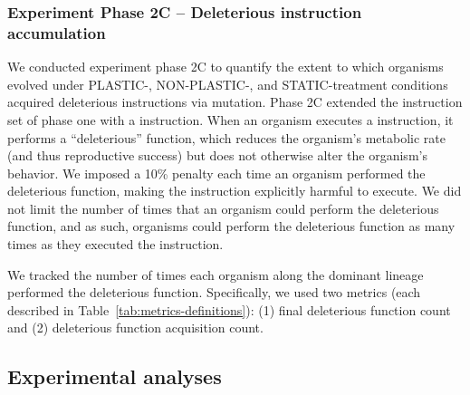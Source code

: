\begin{raggedbottom}
\subsubsection{Experiment Phase 2C -- Deleterious instruction accumulation}
\label{sec:methods:exp:deleterious-instruction-accumulation}

We conducted experiment phase 2C to quantify the extent to which organisms evolved under PLASTIC-, NON-PLASTIC-, and STATIC-treatment conditions acquired deleterious instructions via mutation.
Phase 2C extended the instruction set of phase one with a  instruction.
When an organism executes a  instruction, it performs a ``deleterious'' function, which reduces the organism's metabolic rate (and thus reproductive success) but does not otherwise alter the organism's behavior.
We imposed a 10\% penalty each time an organism performed the deleterious function, making the  instruction explicitly harmful to execute.
We did not limit the number of times that an organism could perform the deleterious function, and as such, organisms could perform the deleterious function as many times as they executed the  instruction.

We tracked the number of times each organism along the dominant lineage performed the deleterious function.
Specifically, we used two metrics (each described in Table~\ref{tab:metrics-definitions}):
(1) final deleterious function count and (2) deleterious function acquisition count.

\subsection{Experimental analyses}


\setlength{\tabcolsep}{16pt}
\renewcommand{\arraystretch}{1.5}
\begin{table}[ht]
    \centering


\end{table}
\end{raggedbottom}
